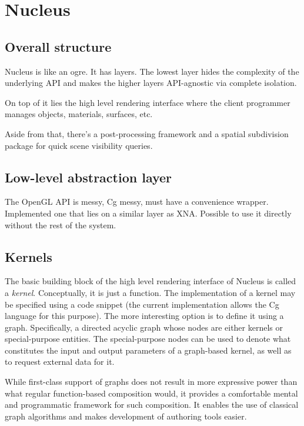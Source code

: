 
\chapter{ Nucleus }
\label{Chapter4}

\section{Overall structure}

Nucleus is like an ogre. It has layers. The lowest layer hides the complexity of the underlying API and makes the higher layers API-agnostic via complete isolation.

On top of it lies the high level rendering interface where the client programmer manages objects, materials, surfaces, etc.

Aside from that, there's a post-processing framework and a spatial subdivision package for quick scene visibility queries.

\section{Low-level abstraction layer}

The OpenGL API is messy, Cg messy, must have a convenience wrapper. Implemented one that lies on a similar layer as XNA. Possible to use it directly without the rest of the system.

\section{Kernels}

The basic building block of the high level rendering interface of Nucleus is called a \emph{kernel}. Conceptually, it is just a function. The implementation of a kernel may be specified using a code snippet (the current implementation allows the Cg language for this purpose). The more interesting option is to define it using a graph. Specifically, a directed acyclic graph whose nodes are either kernels or special-purpose entities. The special-purpose nodes can be used to denote what constitutes the input and output parameters of a graph-based kernel, as well as to request external data for it.

While first-class support of graphs does not result in more expressive power than what regular function-based composition would, it provides a comfortable mental and programmatic framework for such composition. It enables the use of classical graph algorithms and makes development of authoring tools easier.

